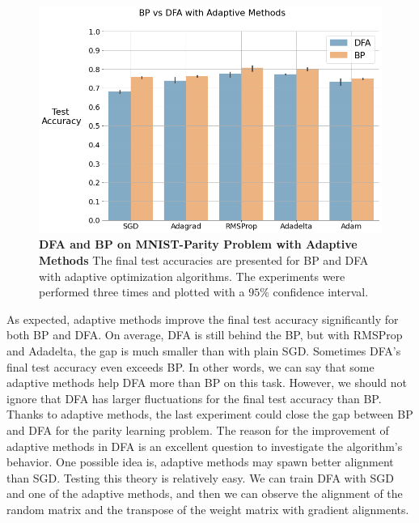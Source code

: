 \documentclass[a4paper, nobind]{templates/ociamthesis}
\begin{document}
\begin{figure}

{\centering \includegraphics[width=1\linewidth]{figures/3_mainExperiment} 

}

\caption[DFA and BP on MNIST-Parity Problem with Adaptive Methods]{\textbf{DFA and BP on MNIST-Parity Problem with Adaptive Methods} \newline The final test accuracies are presented for BP and DFA with adaptive optimization algorithms. The experiments were performed three times and plotted with a $95\%$ confidence interval.}\label{fig:mainExperiment}
\end{figure}

\noindent As expected, adaptive methods improve the final test accuracy significantly for both BP and DFA. On average, DFA is still behind the BP, but with RMSProp and Adadelta, the gap is much smaller than with plain SGD. Sometimes DFA's final test accuracy even exceeds BP. In other words, we can say that some adaptive methods help DFA more than BP on this task. However, we should not ignore that DFA has larger fluctuations for the final test accuracy than BP. Thanks to adaptive methods, the last experiment could close the gap between BP and DFA for the parity learning problem.
\noindent The reason for the improvement of adaptive methods in DFA is an excellent question to investigate the algorithm's behavior. One possible idea is, adaptive methods may spawn better alignment than SGD. Testing this theory is relatively easy. We can train DFA with SGD and one of the adaptive methods, and then we can observe the alignment of the random matrix and the transpose of the weight matrix with gradient alignments.
\end{document}
